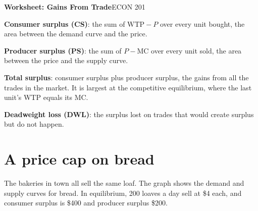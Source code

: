 \documentclass[11pt]{article}
\begin{document}
{\LARGE\bfseries\color{accent} Worksheet: Gains From Trade}\hfill{\large ECON 201}

\newcommand{\term}[1]{\textcolor{accentdark}{\textbf{#1}}}

\newenvironment{deflist}
  {\begin{list}{\textbullet}{%
     \setlength{\leftmargin}{1.1em}\setlength{\labelwidth}{0.7em}%
     \setlength{\labelsep}{0.4em}\setlength{\itemindent}{0pt}%
     \setlength{\listparindent}{0pt}\setlength{\topsep}{2pt}%
     \setlength{\partopsep}{0pt}\setlength{\parsep}{0pt}%
     \setlength{\itemsep}{2pt}}}
  {\end{list}}

\begin{tcolorbox}[colback=cream, colframe=accent, boxrule=0.6pt, arc=2pt,
  left=6pt, right=6pt, top=4pt, bottom=4pt, title=Definitions,
  fonttitle=\bfseries, coltitle=white]
\begin{deflist}
\item \term{Consumer surplus (CS)}: the sum of $\text{WTP} - P$ over every
  unit bought, the area between the demand curve and the price.
\item \term{Producer surplus (PS)}: the sum of $P - \text{MC}$ over every
  unit sold, the area between the price and the supply curve.
\item \term{Total surplus}: consumer surplus plus producer surplus, the
  gains from all the trades in the market. It is largest at the competitive
  equilibrium, where the last unit's WTP equals its MC.
\item \term{Deadweight loss (DWL)}: the surplus lost on trades that would
  create surplus but do not happen.
\end{deflist}
\end{tcolorbox}

\section{A price cap on bread}

The bakeries in town all sell the same loaf. The graph shows the demand and
supply curves for bread. In equilibrium, 200 loaves a day sell at \$4 each,
and consumer surplus is \$400 and producer surplus \$200.
\end{document}
